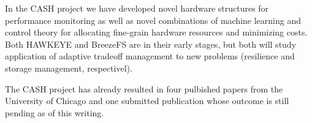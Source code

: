  In the CASH project we have
developed novel hardware structures for performance monitoring as well
as novel combinations of machine learning and control theory for
allocating fine-grain hardware resources and minimizing costs.  Both
HAWKEYE and BreezeFS are in their early stages, but both will study
application of adaptive tradeoff management to new problems
(resilience and storage management, respectivel).  

 The CASH project has already resulted
in four pulbished papers from the University of Chicago
\cite{cpsna,POET,FSE2015,JouleGuard} and one submitted publication
whose outcome is still pending as of this writing.